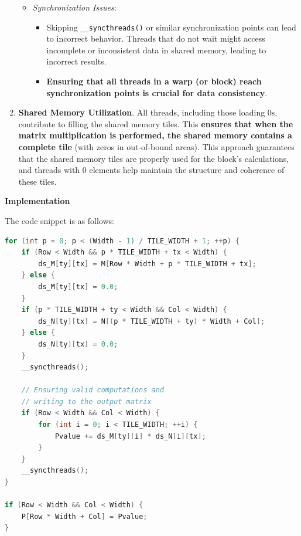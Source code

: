 \begin{enumerate}
\begin{itemize}
        \item \emph{Synchronization Issues}:
        \begin{itemize}
            \item Skipping \texttt{\_\_syncthreads()} or similar synchronization points can lead to incorrect behavior. Threads that do not wait might access incomplete or inconsistent data in shared memory, leading to incorrect results.
            \item \textbf{Ensuring that all threads in a warp (or block) reach synchronization points is crucial for data consistency}.
        \end{itemize}
    \end{itemize}
    
    \item \textbf{Shared Memory Utilization}. All threads, including those loading 0s, contribute to filling the shared memory tiles. This \textbf{ensures that when the matrix multiplication is performed, the shared memory contains a complete tile} (with zeros in out-of-bound areas). This approach guarantees that the shared memory tiles are properly used for the block's calculations, and threads with 0 elements help maintain the structure and coherence of these tiles.
\end{enumerate}

\highspace
\begin{flushleft}
    \textcolor{Green3}{ \textbf{Implementation}}
\end{flushleft}
The code snippet is as follows:
\begin{lstlisting}[language=C++]
for (int p = 0; p < (Width - 1) / TILE_WIDTH + 1; ++p) {
    if (Row < Width && p * TILE_WIDTH + tx < Width) {
        ds_M[ty][tx] = M[Row * Width + p * TILE_WIDTH + tx];
    } else {
        ds_M[ty][tx] = 0.0;
    }
    if (p * TILE_WIDTH + ty < Width && Col < Width) {
        ds_N[ty][tx] = N[(p * TILE_WIDTH + ty) * Width + Col];
    } else {
        ds_N[ty][tx] = 0.0;
    }
    __syncthreads();

    // Ensuring valid computations and 
    // writing to the output matrix
    if (Row < Width && Col < Width) {
        for (int i = 0; i < TILE_WIDTH; ++i) {
            Pvalue += ds_M[ty][i] * ds_N[i][tx];
        }
    }
    __syncthreads();
}

if (Row < Width && Col < Width) {
    P[Row * Width + Col] = Pvalue;
}
\end{lstlisting}

